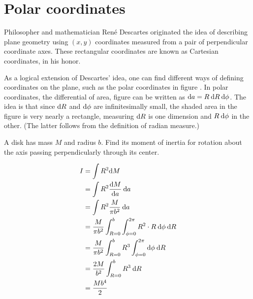 \pagebreak

\section{Polar coordinates}


Philosopher and mathematician Ren\'{e} Descartes originated the idea of describing plane
geometry using $(x,y)$ coordinates measured from a pair of perpendicular coordinate
axes. These rectangular coordinates are known as Cartesian coordinates, in his honor.


As a logical extension of Descartes' idea, one can find different ways of defining coordinates on
the plane, such as the polar coordinates in figure . In polar coordinates,
the differential of area, figure  can be written as $\textup{d} a=R \:\textup{d} R\:\textup{d} \phi$. The idea
is that since $\textup{d} R$ and $\textup{d} \phi$ are infinitesimally small, the shaded area in the figure is very
nearly a rectangle, measuring $\textup{d} R$ is one dimension and $R\:\textup{d} \phi$ in the other. (The latter follows
from the definition of radian measure.)


\begin{eg}
\egquestion A disk has mass $M$ and radius $b$. Find its moment of inertia for rotation about the axis
passing perpendicularly through its center.

\eganswer
\begin{align*}
  I &= \int R^2 \textup{d} M \\
    &= \int R^2 \frac{\textup{d} M}{\textup{d} a}\:\textup{d} a \\
    &= \int R^2 \frac{M}{\pi b^2}\:\textup{d} a \\
    &= \frac{M}{\pi b^2}\int_{R=0}^b \int_{\phi=0}^{2\pi} R^2 \cdot R \:\textup{d} \phi\:\textup{d} R \\
    &= \frac{M}{\pi b^2}\int_{R=0}^b R^3 \int_{\phi=0}^{2\pi} \textup{d} \phi\:\textup{d} R \\
    &= \frac{2 M}{ b^2}\int_{R=0}^b R^3 \:\textup{d} R \\
    &= \frac{M b^4}{2}
\end{align*}
\end{eg}

